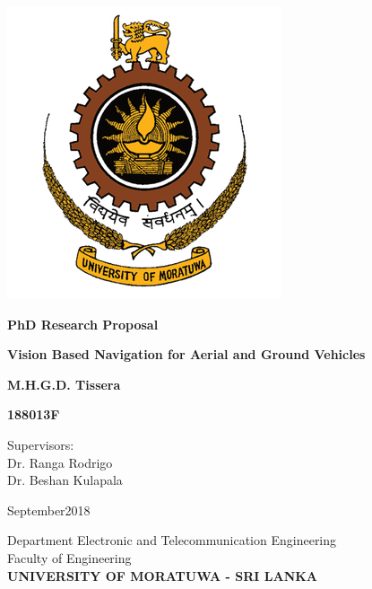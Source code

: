 \begin{titlepage}
	\begin{center}
		\includegraphics[scale=0.5]{figures/uom}
		
		\vspace*{1cm}
		\Large
		\textbf{PhD Research Proposal}
		
		\vspace*{2cm}
		\Huge
		\textbf{Vision Based Navigation for Aerial and Ground Vehicles }
		
		\vspace{1cm}
		\large
		\textbf{M.H.G.D. Tissera}
		
		\vspace{1cm}
		\large
		\textbf{188013F}
		
		\vspace{1.5cm}
		\normalsize
		Supervisors:\\
		Dr. Ranga Rodrigo\\
		Dr. Beshan Kulapala
		
		\vfill
		September2018
		
		\vspace{0.8cm}
		\large
		Department Electronic and Telecommunication Engineering\\
		Faculty of Engineering\\
		\large
		\textbf{UNIVERSITY OF MORATUWA - SRI LANKA}
		
	\end{center}
\end{titlepage}
